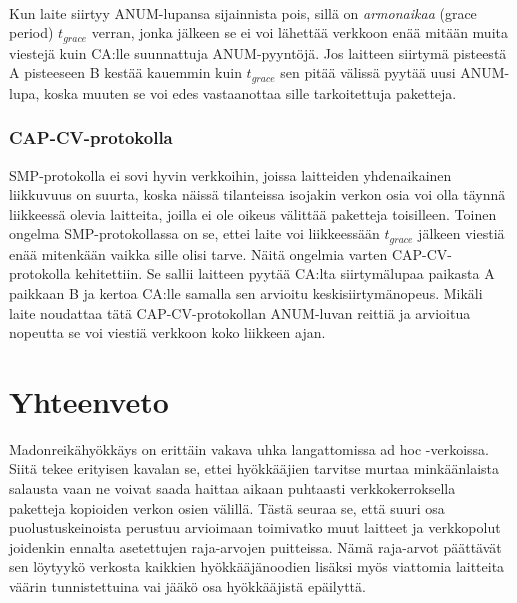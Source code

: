\documentclass[finnish]{tktltiki2}
\theoremstyle{definition}
\theoremstyle{remark}
\begin{document}
\noindent\\
Kun laite siirtyy ANUM-lupansa sijainnista pois, sillä on \emph{armonaikaa} (grace period) $t_{grace}$ verran, jonka jälkeen se ei voi lähettää verkkoon enää mitään muita viestejä kuin CA:lle suunnattuja ANUM-pyyntöjä. Jos laitteen siirtymä pisteestä A pisteeseen B kestää kauemmin kuin $t_{grace}$ sen pitää välissä pyytää uusi ANUM-lupa, koska muuten se voi edes vastaanottaa sille tarkoitettuja paketteja.

\subsubsection{CAP-CV-protokolla}

SMP-protokolla ei sovi hyvin verkkoihin, joissa laitteiden yhdenaikainen liikkuvuus on suurta, koska näissä tilanteissa isojakin verkon osia voi olla täynnä liikkeessä olevia laitteita, joilla ei ole oikeus välittää paketteja toisilleen. Toinen ongelma SMP-protokollassa on se, ettei laite voi liikkeessään $t_{grace}$ jälkeen viestiä enää mitenkään vaikka sille olisi tarve. Näitä ongelmia varten CAP-CV-protokolla kehitettiin. Se sallii laitteen pyytää CA:lta siirtymälupaa paikasta A paikkaan B ja kertoa CA:lle samalla sen arvioitu keskisiirtymänopeus. Mikäli laite noudattaa tätä CAP-CV-protokollan ANUM-luvan reittiä ja arvioitua nopeutta se voi viestiä verkkoon koko liikkeen ajan.

\section{Yhteenveto}

Madonreikähyökkäys on erittäin vakava uhka langattomissa ad hoc -verkoissa. Siitä tekee erityisen kavalan se, ettei hyökkääjien tarvitse murtaa minkäänlaista salausta vaan ne voivat saada haittaa aikaan puhtaasti verkkokerroksella paketteja kopioiden verkon osien välillä. Tästä seuraa se, että suuri osa puolustuskeinoista perustuu arvioimaan toimivatko muut laitteet ja verkkopolut joidenkin ennalta asetettujen raja-arvojen puitteissa. Nämä raja-arvot päättävät sen löytyykö verkosta kaikkien hyökkääjänoodien lisäksi myös viattomia laitteita väärin tunnistettuina vai jääkö osa hyökkääjistä epäilyttä.




%
%
%
\newpage

%






% 
\end{document}

